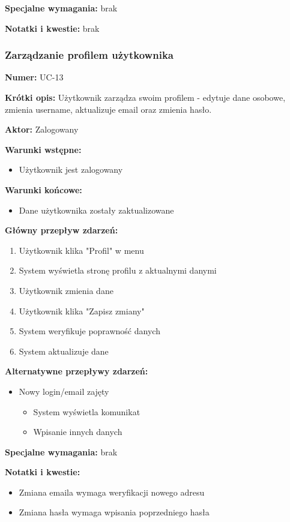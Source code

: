 \documentclass[12pt,a4paper]{article}
\begin{document}
\textbf{Specjalne wymagania:}
brak

\textbf{Notatki i kwestie:} brak

\subsubsection{Zarządzanie profilem użytkownika}

\textbf{Numer:} UC-13

\textbf{Krótki opis:} Użytkownik zarządza swoim profilem - edytuje dane osobowe, zmienia username, aktualizuje email oraz zmienia hasło.

\textbf{Aktor:} Zalogowany

\textbf{Warunki wstępne:}
\begin{itemize}[leftmargin=*]
    \item Użytkownik jest zalogowany
\end{itemize}

\textbf{Warunki końcowe:}
\begin{itemize}[leftmargin=*]
    \item Dane użytkownika zostały zaktualizowane
\end{itemize}

\textbf{Główny przepływ zdarzeń:}
\begin{enumerate}[leftmargin=*]
    \item Użytkownik klika "Profil" w menu
    \item System wyświetla stronę profilu z aktualnymi danymi
    \item Użytkownik zmienia dane
    \item Użytkownik klika "Zapisz zmiany"
    \item System weryfikuje poprawność danych
    \item System aktualizuje dane
\end{enumerate}

\textbf{Alternatywne przepływy zdarzeń:}
\begin{itemize}[leftmargin=*]
    \item[3a] Nowy login/email zajęty
    \begin{itemize}
    \item System wyświetla komunikat
    \item Wpisanie innych danych
\end{itemize}
\end{itemize}

\textbf{Specjalne wymagania:}
brak

\textbf{Notatki i kwestie:}
\begin{itemize}
    \item Zmiana emaila wymaga weryfikacji nowego adresu
    \item Zmiana hasła wymaga wpisania poprzedniego hasła
\end{itemize}
\end{document}
